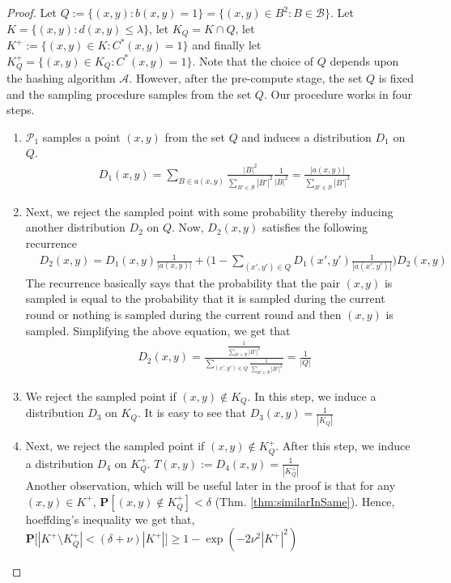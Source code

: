 \documentclass[12pt]{article}
\newcommand{\mb}{\mathbf}
\newcommand{\mc}{\mathcal}
\begin{document}
\begin{proof}
Let $Q := \{(x, y): b(x, y) = 1\} = \{(x, y) \in B^2: B \in \mc B\}$. Let $K = \{(x, y): d(x, y) \le \lambda\}$, let $K_Q = K\cap Q$, let $K^+ := \{(x, y) \in K: C^*(x, y) = 1\}$ and finally let $K_Q^+ = \{(x, y) \in K_Q : C^*(x, y) = 1\}$. Note that the choice of $Q$ depends upon the hashing algorithm $\mc A$. However, after the pre-compute stage, the set $Q$ is fixed and the sampling procedure samples from the set $Q$. Our procedure works in four steps. 
\begin{enumerate}[noitemsep,label=\textbf{S.\arabic*}]
  \item $\mc P_1$ samples a point $(x, y)$ from the set $Q$ and induces a distribution $D_1$ on $Q$. 
  \begin{align*}
    &D_1(x, y) = \sum_{B \in a(x, y)} \frac{|B|^2}{\sum_{B' \in \mc B}|B'|^2}\frac{1}{|B|^2} = \frac{|a(x, y)|}{\sum_{B' \in \mc B}|B'|^2}
  \end{align*}
  \item Next, we reject the sampled point with some probability thereby inducing another distribution $D_2$ on $Q$. Now, $D_2(x, y)$ satisfies the following recurrence
  \begin{align*}
    &D_2(x, y) = D_1(x, y) \frac{1}{|a(x, y)|} + \Big(1-\sum_{(x', y') \in Q} D_1(x', y') \frac{1}{|a(x', y')|}\Big)D_2(x, y)
  \end{align*}
  The recurrence basically says that the probability that the pair $(x, y)$ is sampled is equal to the probability that it is sampled during the current round or nothing is sampled during the current round and then $(x, y)$ is sampled. Simplifying the above equation, we get that
   \begin{align*}
    &D_2(x, y) = \frac{\frac{1}{\sum_{B' \in \mc B}|B'|^2}}{\sum_{(x', y') \in Q}\frac{1}{\sum_{B' \in \mc B}|B'|^2}} = \frac{1}{|Q|}
  \end{align*}
  \item We reject the sampled point if $(x, y) \not\in K_Q$. In this step, we induce a distribution $D_3$ on $K_Q$. It is easy to see that $D_3(x, y) = \frac{1}{|K_Q|}$
  \item \label{item:D4} Next, we reject the sampled point if $(x, y) \not\in K_Q^+$. After this step, we induce a distribution $D_4$ on $K^+_Q$. $T(x, y) := D_4(x, y) = \frac{1}{|K_Q^+|}$\\
  Another observation, which will be useful later in the proof is that for any $(x, y) \in K^+$, $\mb P[(x, y) \not\in K_Q^+] < \delta$ (Thm. \ref{thm:similarInSame}). Hence, hoeffding's inequality we get that, $\mb P\big[|K^+\setminus K_Q^+| < (\delta+\nu)|K^+|\big] \ge 1- \exp(-2\nu^2 |K^+|^2)$ 

\end{enumerate}
\end{proof}
\end{document}
